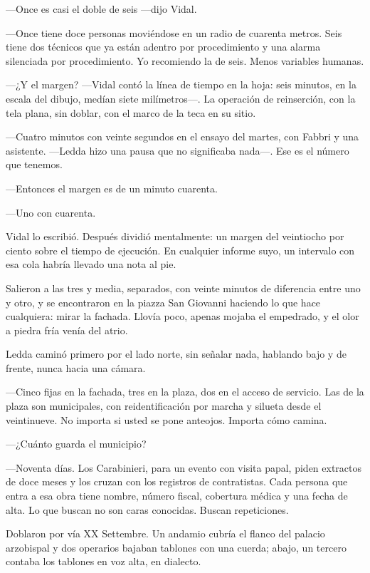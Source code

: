---Once es casi el doble de seis ---dijo Vidal.

---Once tiene doce personas moviéndose en un radio de cuarenta metros. Seis tiene dos técnicos que ya están adentro por procedimiento y una alarma silenciada por procedimiento. Yo recomiendo la de seis. Menos variables humanas.

---¿Y el margen? ---Vidal contó la línea de tiempo en la hoja: seis minutos, en la escala del dibujo, medían siete milímetros---. La operación de reinserción, con la tela plana, sin doblar, con el marco de la teca en su sitio.

---Cuatro minutos con veinte segundos en el ensayo del martes, con Fabbri y una asistente. ---Ledda hizo una pausa que no significaba nada---. Ese es el número que tenemos.

---Entonces el margen es de un minuto cuarenta.

---Uno con cuarenta.

Vidal lo escribió. Después dividió mentalmente: un margen del veintiocho por ciento sobre el tiempo de ejecución. En cualquier informe suyo, un intervalo con esa cola habría llevado una nota al pie.


\scenebreak


Salieron a las tres y media, separados, con veinte minutos de diferencia entre uno y otro, y se encontraron en la piazza San Giovanni haciendo lo que hace cualquiera: mirar la fachada. Llovía poco, apenas mojaba el empedrado, y el olor a piedra fría venía del atrio.

Ledda caminó primero por el lado norte, sin señalar nada, hablando bajo y de frente, nunca hacia una cámara.

---Cinco fijas en la fachada, tres en la plaza, dos en el acceso de servicio. Las de la plaza son municipales, con reidentificación por marcha y silueta desde el veintinueve. No importa si usted se pone anteojos. Importa cómo camina.

---¿Cuánto guarda el municipio?

---Noventa días. Los Carabinieri, para un evento con visita papal, piden extractos de doce meses y los cruzan con los registros de contratistas. Cada persona que entra a esa obra tiene nombre, número fiscal, cobertura médica y una fecha de alta. Lo que buscan no son caras conocidas. Buscan repeticiones.

Doblaron por vía XX Settembre. Un andamio cubría el flanco del palacio arzobispal y dos operarios bajaban tablones con una cuerda; abajo, un tercero contaba los tablones en voz alta, en dialecto.

